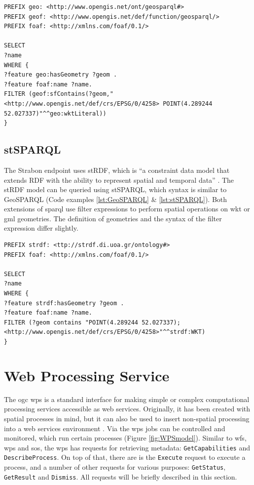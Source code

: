\begin{lstlisting}[float,caption={A GeoSPARQL query to find the names of features that contain a point geometry}, label={lst:GeoSPARQL}]
PREFIX geo: <http://www.opengis.net/ont/geosparql#>
PREFIX geof: <http://www.opengis.net/def/function/geosparql/>
PREFIX foaf: <http://xmlns.com/foaf/0.1/> 

SELECT 
?name
WHERE {
?feature geo:hasGeometry ?geom .
?feature foaf:name ?name.
FILTER (geof:sfContains(?geom,"<http://www.opengis.net/def/crs/EPSG/0/4258> POINT(4.289244 52.027337)"^^geo:wktLiteral))
}
\end{lstlisting}

\subsection{stSPARQL}
\label{par:stSPARQL}
The Strabon endpoint uses stRDF, which is \enquote{a constraint data model that extends RDF with the ability to represent spatial and temporal data} \cite[p. 425]{SSW:Koubarakis}. The stRDF model can be queried using stSPARQL, which syntax is similar to GeoSPARQL (Code examples \ref{lst:GeoSPARQL} \& \ref{lst:stSPARQL}). Both extensions of \ac{sparql} use filter expressions to perform spatial operations on \ac{wkt} or \ac{gml} geometries. The definition of geometries and the syntax of the filter expression differ slightly.

\begin{lstlisting}[float,caption={A stSPARQL query to find the names of features that contain a point geometry}, label={lst:stSPARQL}]
PREFIX strdf: <ttp://strdf.di.uoa.gr/ontology#>
PREFIX foaf: <http://xmlns.com/foaf/0.1/> 

SELECT 
?name
WHERE {
?feature strdf:hasGeometry ?geom .
?feature foaf:name ?name.
FILTER (?geom contains "POINT(4.289244 52.027337);<http://www.opengis.net/def/crs/EPSG/0/4258>"^^strdf:WKT)
}
\end{lstlisting}

\section{Web Processing Service}
\label{par:wps}
The \ac{ogc} \acl{wps} is a standard interface for making simple or complex computational processing services accessible as web services. Originally, it has been created with spatial processes in mind, but it can also be used to insert non-spatial processing into a web services environment \citep[p. 8]{GEO:OGC}. Via the \ac{wps} jobs can be controlled and monitored, which run certain processes (Figure \ref{fig:WPSmodel}). Similar to \ac{wfs}, \ac{wps} and \ac{sos}, the \ac{wps} has requests for retrieving metadata: \texttt{GetCapabilities} and \texttt{DescribeProcess}. On top of that, there are is the \texttt{Execute} request to execute a process, and a number of other requests for various purposes: \texttt{GetStatus}, \texttt{GetResult} and \texttt{Dismiss}. All requests will be briefly described in this section.  

